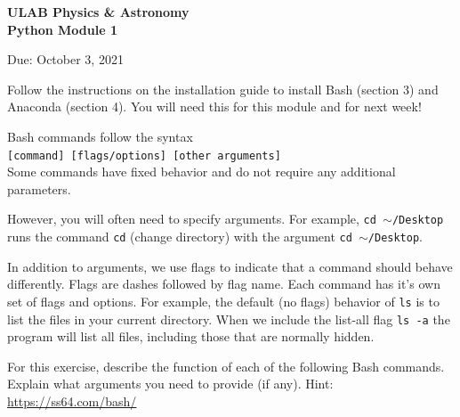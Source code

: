 \documentclass[addpoints,12pt]{exam}
\numberwithin{equation}{section}
\begin{document}
	
	\vspace*{-3cm}{\footnotesize\hfill Copyright \copyright\ 2021, Undergraduate Lab at Berkeley}
	\vspace{0.5cm}
	
	\begin{center}
		\textbf{\Large{ULAB Physics \& Astronomy\\Python Module 1}}
	\end{center}
	\begin{center}
		Due: October 3, 2021
	\end{center}
	
	\begin{questions}
		
		\question[0] Follow the instructions on the installation guide to install Bash (section 3) and Anaconda (section 4). You will need this for this module and for next week!
		
		\question[10] Bash commands follow the syntax \\\verb|[command] [flags/options] [other arguments]|\\Some commands have fixed behavior and do not require any additional parameters. 
		
		However, you will often need to specify arguments. For example, \verb|cd |$\sim$\verb|/Desktop| runs the command \verb|cd| (change directory) with the argument \verb|cd |$\sim$\verb|/Desktop|.
		
		In addition to arguments, we use flags to indicate that a command should behave differently. Flags are dashes followed by flag name. Each command has it's own set of flags and options. For example, the default (no flags) behavior of \verb|ls| is to list the files in your current directory. When we include the list-all flag  \verb|ls -a| the program will list all files, including those that are normally hidden.
		
		
		For this exercise, describe the function of each of the following Bash commands. Explain what arguments you need to provide (if any). Hint: \hyperref{https://ss64.com/bash/}{}{}{https://ss64.com/bash/}
		
\end{questions}
\end{document}

